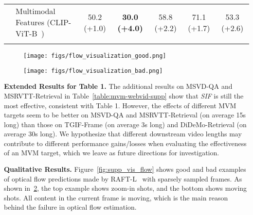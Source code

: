 \documentclass[10pt,twocolumn,letterpaper]{article}
\newlength\savewidth
\newcommand\shline{\noalign{\global\savewidth\arrayrulewidth\global\arrayrulewidth 1pt}\hline\noalign{\global\arrayrulewidth\savewidth}}
\begin{document}
\begin{table*}[t]
\begin{tabular}{ll| ccccc}
          & Multimodal Features (CLIP-ViT-B~\cite{radford2021clip}) & 50.2 {\color{ForestGreen}(+1.0)} & \textbf{30.0 {\color{ForestGreen}(+4.0)}} & 58.8 {\color{ForestGreen}(+2.2)}& 71.1 {\color{ForestGreen}(+1.7)} & 53.3 {\color{ForestGreen}(+2.6)}\\
        \shline
    \end{tabular}
\caption{\textbf{Comparing target features for MVM applied to video-text data}. All variants are pre-trained on WebVid~\cite{bain2021frozen} for 5 epochs. Masking is performed randomly (RM) with a ratio of 15\%. The final pre-training setting is highlighted in \colorbox{lightgray}{gray}. }
    \label{table:mvm-webvid-supp}
    \vspace{1ex}
\end{table*} \begin{figure*}[t!]
    \centering
    \begin{subfigure}[t]{0.48\textwidth}
        \centering
        \texttt{[image: figs/flow\_visualization\_good.png]}
        \caption{}
        \label{subfig:flow_good}
    \end{subfigure}
    \begin{subfigure}[t]{0.48\textwidth}
        \centering
        \texttt{[image: figs/flow\_visualization\_bad.png]}
        \caption{}
        \label{subfig:flow_bad}
    \end{subfigure}
    \vspace{13pt}
    \caption{\textbf{Visualization of optical flow (Flow) predictions by RAFT-L~\cite{teed2020raft} with sparsely sampled frames}. We show examples of good cases in (a) and bad cases in (b).}
    \label{fig:supp_vis_flow}
\end{figure*}

\vspace{0.5ex}
\noindent \textbf{Extended Results for Table 1.} The additional results on MSVD-QA and MSRVTT-Retrieval in Table~\ref{table:mvm-webvid-supp} show that \textit{SIF} is still the most effective, consistent with Table 1. However, the effects of different MVM targets seem to be better on MSVD-QA and MSRVTT-Retrieval (on average 15s long) than those on TGIF-Frame (on average 3s long) and DiDeMo-Retrieval (on average 30s long). We hypothesize that different downstream video lengths may contribute to different performance gains/losses when evaluating the effectiveness of an MVM target, which we leave as future directions for investigation. 

\vspace{0.5ex}
\noindent \textbf{Qualitative Results.}
Figure~\ref{fig:supp_vis_flow} shows good and bad examples of optical flow predictions made by RAFT-L~\cite{teed2020raft} with sparsely sampled frames. As shown in~\ref{subfig:flow_bad}, the top example shows zoom-in shots, and the bottom shows moving shots. All content in the current frame is moving, which is the main reason behind the failure in optical flow estimation.
\end{document}
